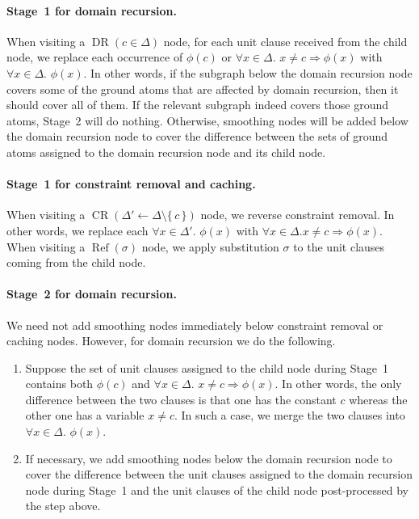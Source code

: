 \documentclass{article}
\theoremstyle{definition}
\DeclareMathOperator{\CR}{CR}
\DeclareMathOperator{\DR}{DR}
\DeclareMathOperator{\Reff}{Ref}
\begin{document}
\paragraph{Stage~1 for domain recursion.}
When visiting a $\DR(c \in \Delta)$ node, for each unit clause received from the
child node, we replace each occurrence of $\phi(c)$ or
$\forall x \in \Delta\text{. } x \ne c \Rightarrow \phi(x)$ with
$\forall x \in \Delta\text{. }\phi(x)$. In other words, if the subgraph below
the domain recursion node covers some of the ground atoms that are affected by
domain recursion, then it should cover all of them. If the relevant subgraph
indeed covers those ground atoms, Stage~2 will do nothing. Otherwise, smoothing
nodes will be added below the domain recursion node to cover the difference
between the sets of ground atoms assigned to the domain recursion node and its
child node.

\paragraph{Stage~1 for constraint removal and caching.}
When visiting a $\CR(\Delta' \gets \Delta \setminus \{\,c\,\})$ node, we reverse
constraint removal. In other words, we replace each
$\forall x \in \Delta'\text{. }\phi(x)$ with $\forall x \in \Delta\text{.
}x \ne c \Rightarrow \phi(x)$. When visiting a $\Reff(\sigma)$ node, we apply
substitution $\sigma$ to the unit clauses coming from the child node.

\paragraph{Stage~2 for domain recursion.}
We need not add smoothing nodes immediately below constraint removal or caching
nodes. However, for domain recursion we do the following.
\begin{enumerate}
  \item Suppose the set of unit clauses assigned to the child node during
        Stage~1 contains both $\phi(c)$ and $\forall x \in \Delta\text{.
        } x \ne c \Rightarrow \phi(x)$. In other words, the only difference
        between the two clauses is that one has the constant $c$ whereas the
        other one has a variable $x \ne c$. In such a case, we merge the two
        clauses into $\forall x \in \Delta\text{. }\phi(x)$.
  \item If necessary, we add smoothing nodes below the domain recursion node to
        cover the difference between the unit clauses assigned to the domain
        recursion node during Stage~1 and the unit clauses of the child node
        post-processed by the step above.
\end{enumerate}
\end{document}
